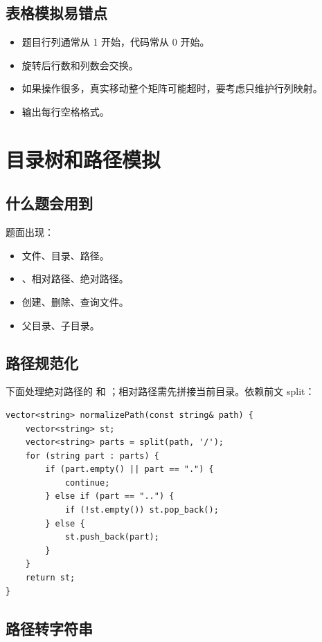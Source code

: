 \subsection{表格模拟易错点}

\begin{itemize}
  \item 题目行列通常从 1 开始，代码常从 0 开始。
  \item 旋转后行数和列数会交换。
  \item 如果操作很多，真实移动整个矩阵可能超时，要考虑只维护行列映射。
  \item 输出每行空格格式。
\end{itemize}

\section{目录树和路径模拟}\label{sec:07-18}

\subsection{什么题会用到}

题面出现：

\begin{itemize}
  \item 文件、目录、路径。
  \item {}、相对路径、绝对路径。
  \item 创建、删除、查询文件。
  \item 父目录、子目录。
\end{itemize}

\subsection{路径规范化}

下面处理绝对路径的  和 ；相对路径需先拼接当前目录。依赖前文 split：

\begin{lstlisting}
vector<string> normalizePath(const string& path) {
    vector<string> st;
    vector<string> parts = split(path, '/');
    for (string part : parts) {
        if (part.empty() || part == ".") {
            continue;
        } else if (part == "..") {
            if (!st.empty()) st.pop_back();
        } else {
            st.push_back(part);
        }
    }
    return st;
}
\end{lstlisting}

\subsection{路径转字符串}

